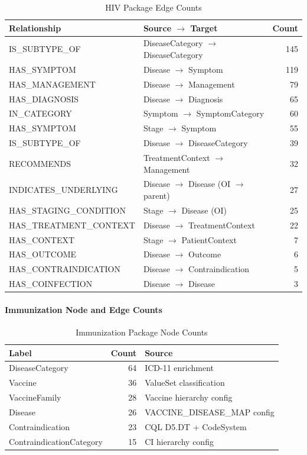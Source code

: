 \begin{table}[H]
\centering
\caption{HIV Package Edge Counts}
\label{tab:hiv_edges}
\begin{tabular}{l l r}
\hline
\textbf{Relationship} & \textbf{Source $\rightarrow$ Target} & \textbf{Count} \\
\hline
IS\_SUBTYPE\_OF & DiseaseCategory $\rightarrow$ DiseaseCategory & 145 \\
HAS\_SYMPTOM & Disease $\rightarrow$ Symptom & 119 \\
HAS\_MANAGEMENT & Disease $\rightarrow$ Management & 79 \\
HAS\_DIAGNOSIS & Disease $\rightarrow$ Diagnosis & 65 \\
IN\_CATEGORY & Symptom $\rightarrow$ SymptomCategory & 60 \\
HAS\_SYMPTOM & Stage $\rightarrow$ Symptom & 55 \\
IS\_SUBTYPE\_OF & Disease $\rightarrow$ DiseaseCategory & 39 \\
RECOMMENDS & TreatmentContext $\rightarrow$ Management & 32 \\
INDICATES\_UNDERLYING & Disease $\rightarrow$ Disease (OI $\rightarrow$ parent) & 27 \\
HAS\_STAGING\_CONDITION & Stage $\rightarrow$ Disease (OI) & 25 \\
HAS\_TREATMENT\_CONTEXT & Disease $\rightarrow$ TreatmentContext & 22 \\
HAS\_CONTEXT & Stage $\rightarrow$ PatientContext & 7 \\
HAS\_OUTCOME & Disease $\rightarrow$ Outcome & 6 \\
HAS\_CONTRAINDICATION & Disease $\rightarrow$ Contraindication & 5 \\
HAS\_COINFECTION & Disease $\rightarrow$ Disease & 3 \\
\hline
\end{tabular}
\end{table}

\paragraph{Immunization Node and Edge Counts}

\begin{table}[H]
\centering
\caption{Immunization Package Node Counts}
\label{tab:imm_nodes}
\begin{tabular}{l r l}
\hline
\textbf{Label} & \textbf{Count} & \textbf{Source} \\
\hline
DiseaseCategory & 64 & ICD-11 enrichment \\
Vaccine & 36 & ValueSet classification \\
VaccineFamily & 28 & Vaccine hierarchy config \\
Disease & 26 & VACCINE\_DISEASE\_MAP config \\
Contraindication & 23 & CQL D5.DT + CodeSystem \\
ContraindicationCategory & 15 & CI hierarchy config \\
\hline
\end{tabular}
\end{table}

